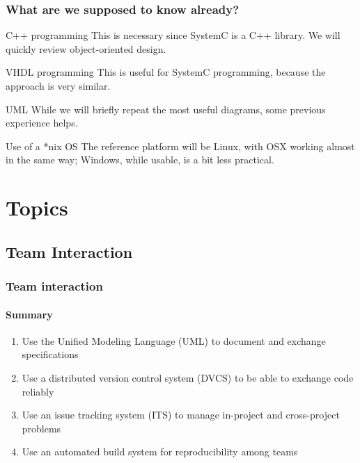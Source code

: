 \begin{frame}
\frametitle{What are we supposed to know already?}

{\small
\begin{block}{C++ programming}
This is necessary since SystemC is a C++ library. We will quickly review object-oriented design.
\end{block}
\begin{block}{VHDL programming}
This is useful for SystemC programming, because the approach is very similar.
\end{block}
\begin{block}{UML}
While we will briefly repeat the most useful diagrams, some previous experience helps.
\end{block}
\begin{block}{Use of a *nix OS}
The reference platform will be Linux, with OSX working almost in the same way; Windows, while usable, is a bit less practical.
\end{block}
}
\end{frame}

\section{Topics}

\subsection{Team Interaction}

\begin{frame}
\frametitle{Team interaction}
\framesubtitle{Summary}
\begin{enumerate}
\item Use the Unified Modeling Language (UML) to document and exchange specifications
\item Use a distributed version control system (DVCS) to be able to exchange code reliably
\item Use an issue tracking system (ITS) to manage in-project and cross-project problems
\item Use an automated build system for reproducibility among teams
\end{enumerate}
\end{frame}

